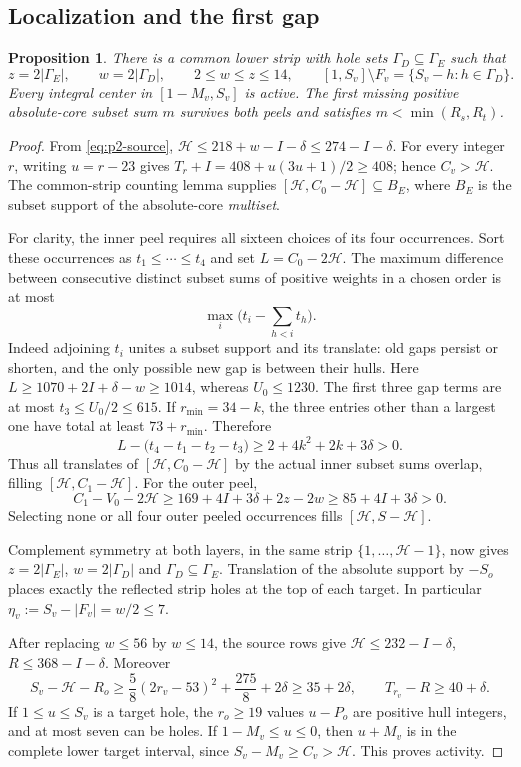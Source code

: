 \documentclass[11pt,letterpaper]{article}
\newtheorem{proposition}[theorem]{Proposition}
\theoremstyle{definition}\newtheorem{definition}[theorem]{Definition}
\begin{document}
\subsection{Localization and the first gap}
\begin{proposition}\label{prop:p2-local}
There is a common lower strip with hole sets $\Gamma_D\subseteq\Gamma_E$
such that
\[
 z=2|\Gamma_E|,\qquad w=2|\Gamma_D|,\qquad
 2\le w\le z\le14,
 \qquad [1,S_v]\setminus F_v=\{S_v-h:h\in\Gamma_D\}.
\]
Every integral center in $[1-M_v,S_v]$ is active. The first missing positive
absolute-core subset sum $m$ survives both peels and satisfies
$m<\min(R_s,R_t)$.
\end{proposition}
\begin{proof}
From \eqref{eq:p2-source},
$\mathcal H\le218+w-I-\delta\le274-I-\delta$.
For every integer $r$, writing $u=r-23$ gives
$T_r+I=408+u(3u+1)/2\ge408$; hence $C_v>\mathcal H$.
The common-strip counting lemma supplies
$[\mathcal H,C_0-\mathcal H]\subseteq B_E$, where $B_E$ is the
subset support of the absolute-core \emph{multiset}.

For clarity, the inner peel requires all sixteen choices of its four
occurrences. Sort these occurrences as $t_1\le\cdots\le t_4$ and set
$L=C_0-2\mathcal H$. The maximum difference between consecutive distinct
subset sums of positive weights in a chosen order is at most
\[
 \max_i\bigl(t_i-\sum_{h<i}t_h\bigr).
\]
Indeed adjoining $t_i$ unites a subset support and its translate: old gaps
persist or shorten, and the only possible new gap is between their hulls.
Here $L\ge1070+2I+\delta-w\ge1014$, whereas $U_0\le1230$.
The first three gap terms are at most $t_3\le U_0/2\le615$.
If $r_{\min}=34-k$, the three entries other than a largest one have total
at least $73+r_{\min}$. Therefore
\[
 L-\bigl(t_4-t_1-t_2-t_3\bigr)
 \ge2+4k^2+2k+3\delta>0.
\]
Thus all translates of $[\mathcal H,C_0-\mathcal H]$ by the actual inner
subset sums overlap, filling $[\mathcal H,C_1-\mathcal H]$.
For the outer peel,
\[
 C_1-V_0-2\mathcal H\ge169+4I+3\delta+2z-2w
 \ge85+4I+3\delta>0.
\]
Selecting none or all four outer peeled occurrences fills
$[\mathcal H,S-\mathcal H]$.

Complement symmetry at both layers, in the same strip
$\{1,\ldots,\mathcal H-1\}$, now gives
$z=2|\Gamma_E|$, $w=2|\Gamma_D|$ and
$\Gamma_D\subseteq\Gamma_E$. Translation of the absolute support by
$-S_o$ places exactly the reflected strip holes at the top of each target.
In particular $\eta_v:=S_v-|F_v|=w/2\le7$.

After replacing $w\le56$ by $w\le14$, the source rows give
$\mathcal H\le232-I-\delta$, $R\le368-I-\delta$. Moreover
\[
 S_v-\mathcal H-R_o
 \ge\frac58(2r_v-53)^2+\frac{275}{8}+2\delta
 \ge35+2\delta,\qquad T_{r_v}-R\ge40+\delta.
\]
If $1\le u\le S_v$ is a target hole, the $r_o\ge19$ values
$u-P_o$ are positive hull integers, and at most seven can be holes.
If $1-M_v\le u\le0$, then $u+M_v$ is in the complete lower target
interval, since $S_v-M_v\ge C_v>\mathcal H$. This proves activity.


\end{proof}
\end{document}
